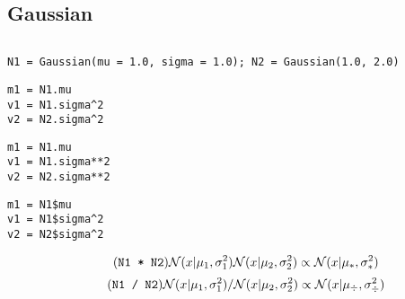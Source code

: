 \documentclass[article]{jss}
\newif\ifen
\newif\ifes
\newcommand{\en}[1]{\ifen#1\fi}
\newcommand{\es}[1]{\ifes#1\fi}
\newcommand{\N}{\mathcal{N}}
\begin{document}
\subsection{Gaussian}\label{sec:Gasussian}

\en{The \texttt{Gaussian} class does most of the computation of the packages.}
\es{La clase \texttt{Gaussian} realiza la mayor parte del c\'omputo en todos los paquetes.}
%
\en{It is represented by two parameters, the mean and the standard deviation.}
\es{Se representa mediante dos par\'ametros, la media y el desv\'io estandar.}
%
\begin{lstlisting}[backgroundcolor=\color{white},label=lst:N1_N2, caption=\relax, belowskip=-1.0 \baselineskip, aboveskip=-0 \baselineskip]
\end{lstlisting}
\begin{lstlisting}[backgroundcolor=\color{all}, belowskip=-0.77 \baselineskip]
N1 = Gaussian(mu = 1.0, sigma = 1.0); N2 = Gaussian(1.0, 2.0)  
\end{lstlisting}
\begin{paracol}{3}
\begin{lstlisting}[backgroundcolor=\color{julia}]
m1 = N1.mu
v1 = N1.sigma^2
v2 = N2.sigma^2
\end{lstlisting}
\switchcolumn
\begin{lstlisting}[backgroundcolor=\color{python}]
m1 = N1.mu
v1 = N1.sigma**2
v2 = N2.sigma**2
\end{lstlisting}
\switchcolumn
\begin{lstlisting}[backgroundcolor=\color{r}]
m1 = N1$mu
v1 = N1$sigma^2
v2 = N2$sigma^2
\end{lstlisting}
\end{paracol}
%
\en{The class overwrites the operators addition (\texttt{+}), subtraction (\texttt{-}), product (\texttt{*}) and division (\texttt{/}) with the main properties required to compute the marginal distributions in the TrueSkill Through Time model.}
\es{La clase sobreescribe los operadores suma (\texttt{+}), resta (\texttt{-}), producto (\texttt{*}) y divisi\'on (\texttt{/}) con las principales propiedades requeridas para computar las distribuciones marginales en el modelo TrueSkill Through Time.}
%
\begin{equation} \tag{\texttt{N1 * N2}}
 \N(x|\mu_1,\sigma_1^2)\N(x|\mu_2,\sigma_2^2) \propto \N(x|\mu_{*},\sigma_{*}^2)
\end{equation}
%
\begin{equation} \tag{\texttt{N1 / N2}}
 \N(x|\mu_1,\sigma_1^2)/\N(x|\mu_2,\sigma_2^2) \propto \N(x|\mu_{\div},\sigma_{\div}^2)
\end{equation} 
\end{document}
